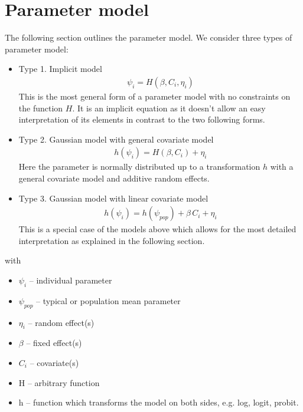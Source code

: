 \section{Parameter model}
\label{sec:parameterModel}
\label{maths:parameter_defn}
\label{maths:parameter-model}

The following section outlines the parameter model. We consider three types of parameter model:
\begin{itemize}
\item
Type 1. Implicit model 
\begin{align*}
\psi_i = H(\beta, C_i, \eta_i)
\end{align*}
This is the most general form of a parameter model with no constraints on the function $H$.
It is an implicit equation as it doesn't allow an easy interpretation of its elements in contrast to the two following forms.
\item
Type 2. Gaussian model with general covariate model 
\begin{align*}
h(\psi_i) = H(\beta, C_i) + \eta_i
\end{align*}
Here the parameter is normally distributed up to a transformation $h$ with a general covariate model and additive random effects.
\item
Type 3. Gaussian model with linear covariate model 
\begin{align*}
h(\psi_i) = h(\psi_{pop}) + \beta \, C_i + \eta_i
\end{align*}
This is a special case of the models above which allows for the most detailed interpretation as explained in the following section.
\end{itemize}
with
\begin{itemize}
\item
$\psi_i$ -- individual parameter
\item
$\psi_{pop}$ -- typical or population mean parameter
\item
$\eta_i$ -- random effect(s)
\item
$\beta$ -- fixed effect(s)
\item
$C_i$ -- covariate(s)
\item
H -- arbitrary function
\item
h -- function which transforms the model on both sides, e.g. log, logit, probit.
\end{itemize}

